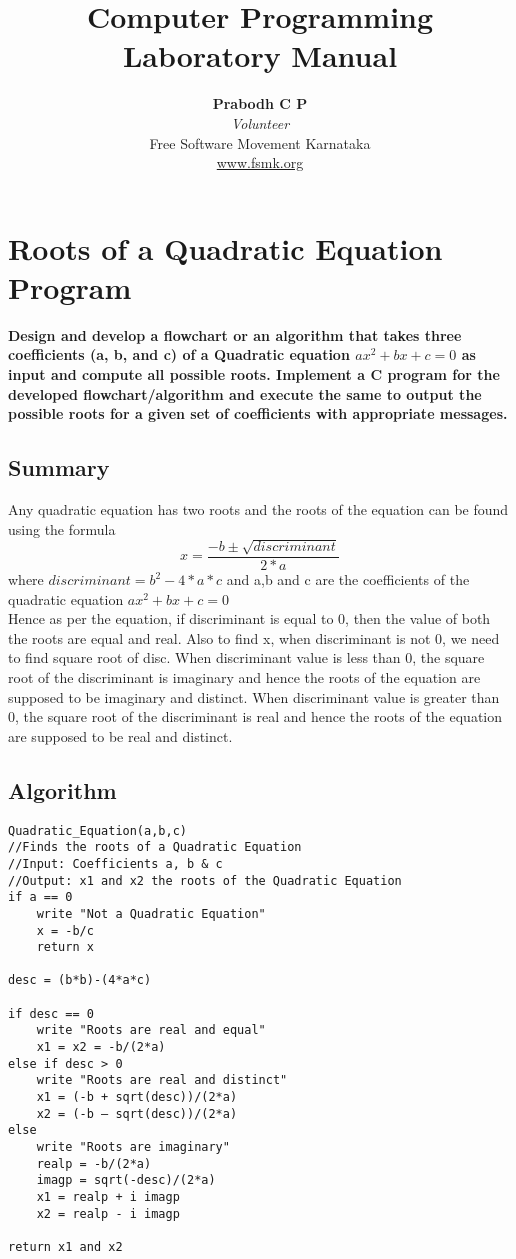 \documentclass[a4paper]{report}
\begin{document}
\title{Computer Programming Laboratory Manual}
\author{\textbf{Prabodh C P}\\\textit{Volunteer}\\Free Software Movement Karnataka\\ \url{www.fsmk.org}}
\maketitle
\tableofcontents

\chapter{Roots of a Quadratic Equation Program}
{\selectfont \textbf{Design and develop a flowchart or an algorithm that takes three coefficients (a, b, and c) of a Quadratic equation \textbf{\(ax^{2}+bx+c=0\)} as input and compute all possible roots. Implement a C program for the developed flowchart/algorithm and execute the same to output the possible roots for a given set of coefficients with appropriate messages.
}}


\section*{Summary}
Any quadratic equation has two roots and the roots of the equation can be found using the formula
\[x=\frac{-b\pm\sqrt{discriminant}}{2*a}\] where \(discriminant={b^{2}-4*a*c}\) and a,b and c are the coefficients of the quadratic equation \textbf{\(ax^{2}+bx+c=0\)}\\
Hence as per the equation, if discriminant is equal to 0, then the value of both the roots are equal and real. Also to find x, when discriminant is not 0, we need to find square root of disc. When discriminant value is less than 0, the square root of the discriminant is imaginary and hence the roots of the equation are supposed to be imaginary and distinct. When discriminant value is greater than 0, the square root of the discriminant is real and hence the roots of the equation are supposed to be real and distinct.

\section*{Algorithm}
\begin{Verbatim}
Quadratic_Equation(a,b,c)
//Finds the roots of a Quadratic Equation
//Input: Coefficients a, b & c
//Output: x1 and x2 the roots of the Quadratic Equation
if a == 0
	write "Not a Quadratic Equation"
	x = -b/c
	return x

desc = (b*b)-(4*a*c)

if desc == 0
	write "Roots are real and equal"
	x1 = x2 = -b/(2*a)
else if desc > 0
	write "Roots are real and distinct"
	x1 = (-b + sqrt(desc))/(2*a)
	x2 = (-b – sqrt(desc))/(2*a)
else
	write "Roots are imaginary"
	realp = -b/(2*a)
	imagp = sqrt(-desc)/(2*a)
	x1 = realp + i imagp
	x2 = realp - i imagp

return x1 and x2

\end{Verbatim}
\end{document}
